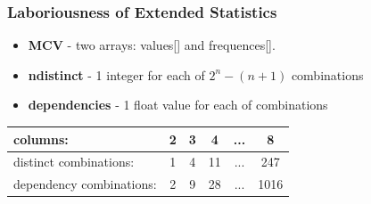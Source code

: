 \documentclass{beamer}
\begin{document}

\begin{frame}[fragile]\frametitle{Laboriousness of Extended Statistics}
\begin{itemize}
  \item \textbf{MCV} - two arrays: values[] and frequences[].
  \item \textbf{ndistinct} - 1 integer for each of $2^n - (n+1)$ combinations
  \item \textbf{dependencies} - 1 float value for each of combinations
\end{itemize}
\vspace{20pt}
\begin{center}
\begin{tabular}{|l|c|c|c|c|c|}
\hline
columns: & 2 & 3 & 4 & ... & 8 \\
\hline
distinct combinations: & 1 & 4 & 11 & ... & 247 \\
\hline
dependency combinations: & 2 & 9 & 28 & ... & 1016 \\
\hline
\end{tabular}
\end{center}
\end{frame}
\end{document}
